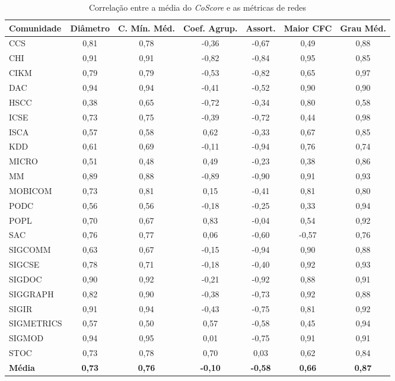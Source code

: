 
\begin{table}[!htbp]
\centering
\caption{Correlação entre a média do \textit{CoScore} e as métricas de redes}
\label{tab:correlation_metrics}
{\tiny
\begin{tabular}{|l|c|c|c|c|c|c|} \hline
\textbf{Comunidade} & \textbf{Diâmetro} & \textbf{C. Mín. Méd.} & \textbf{Coef. Agrup.} & \textbf{Assort.} & \textbf{Maior CFC} & \textbf{Grau Méd.} \\ \hline
CCS & 0,81 & 0,78 & -0,36 & -0,67 & 0,49 & 0,88 \\ \hline
CHI & 0,91 & 0,91 & -0,82 & -0,84 & 0,95 & 0,85 \\ \hline
CIKM & 0,79 & 0,79 & -0,53 & -0,82 & 0,65 & 0,97 \\ \hline
DAC & 0,94 & 0,94 & -0,41 & -0,52 & 0,90 & 0,90 \\ \hline
HSCC & 0,38 & 0,65 & -0,72 & -0,34 & 0,80 & 0,58 \\ \hline
ICSE & 0,73 & 0,75 & -0,39 & -0,72 & 0,44 & 0,98 \\ \hline
ISCA & 0,57 & 0,58 & 0,62 & -0,33 & 0,67 & 0,85 \\ \hline
KDD & 0,61 & 0,69 & -0,11 & -0,94 & 0,76 & 0,74 \\ \hline
MICRO & 0,51 & 0,48 & 0,49 & -0,23 & 0,38 & 0,86 \\ \hline
MM & 0,89 & 0,88 & -0,89 & -0,90 & 0,91 & 0,93 \\ \hline
MOBICOM & 0,73 & 0,81 & 0,15 & -0,41 & 0,81 & 0,80 \\ \hline
PODC & 0,56 & 0,56 & -0,18 & -0,25 & 0,33 & 0,94 \\ \hline
POPL & 0,70 & 0,67 & 0,83 & -0,04 & 0,54 & 0,92 \\ \hline
SAC & 0,76 & 0,77 & 0,06 & -0,60 & -0,57 & 0,76 \\ \hline
SIGCOMM & 0,63 & 0,67 & -0,15 & -0,94 & 0,90 & 0,88 \\ \hline
SIGCSE & 0,78 & 0,71 & -0,18 & -0,40 & 0,92 & 0,93 \\ \hline
SIGDOC & 0,90 & 0,92 & -0,21 & -0,92 & 0,88 & 0,91 \\ \hline
SIGGRAPH & 0,82 & 0,90 & -0,38 & -0,73 & 0,92 & 0,88 \\ \hline
SIGIR & 0,91 & 0,94 & -0,43 & -0,75 & 0,81 & 0,92 \\ \hline
SIGMETRICS & 0,57 & 0,50 & 0,57 & -0,58 & 0,45 & 0,94 \\ \hline
SIGMOD & 0,94 & 0,95 & 0,01 & -0,75 & 0,91 & 0,91 \\ \hline
STOC & 0,73 & 0,78 & 0,70 & 0,03 & 0,62 & 0,84 \\ \hline \hline
{\textbf{Média}} & {\textbf{0,73}} & {\textbf{0,76}} & {\textbf{-0,10}} & {\textbf{-0,58}} & {\textbf{0,66}} & {\textbf{0,87}} \\ \hline
\end{tabular}
}
\end{table}


